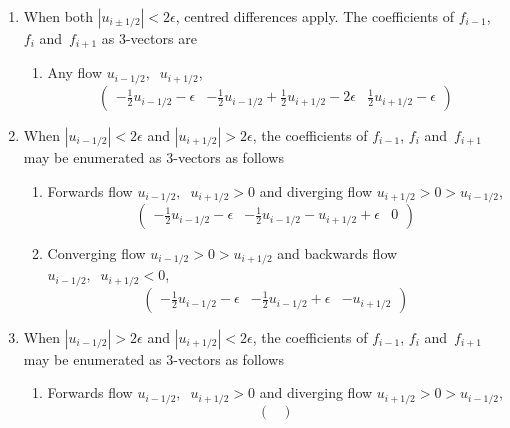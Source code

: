 \begin{enumerate}
\item When both $|u_{i\pm 1/2}|<2\epsilon$, centred differences apply. 
The coefficients of $f_{i-1}$, $f_i$ and~$f_{i+1}$ as 3-vectors are
\begin{enumerate}
\item Any flow $u_{i-1/2},\;\; u_{i+1/2}$,
\begin{equation}\begin{pmatrix}
-\frac{1}{2}u_{i-1/2}-\epsilon & -\frac{1}{2}u_{i-1/2} + \frac{1}{2}u_{i+1/2}-2\epsilon & \frac{1}{2}u_{i+1/2}-\epsilon
\end{pmatrix} \end{equation}
\end{enumerate}
\item When $|u_{i-1/2}|< 2\epsilon$ and $|u_{i+1/2}|> 2\epsilon$,
the coefficients of $f_{i-1}$, $f_i$ and~$f_{i+1}$
may be enumerated as 3-vectors as follows
\begin{enumerate}
\item Forwards flow $u_{i-1/2},\;\; u_{i+1/2} > 0$ and diverging flow $u_{i+1/2}>0>u_{i-1/2}$,
\begin{equation}\begin{pmatrix}
-\frac{1}{2}u_{i-1/2} -\epsilon & -\frac{1}{2}u_{i-1/2} -u_{i+1/2}+\epsilon & 0
\end{pmatrix} \end{equation}
\item Converging flow $u_{i-1/2}>0>u_{i+1/2}$ and backwards flow $u_{i-1/2},\;\; u_{i+1/2} < 0$,
\begin{equation}\begin{pmatrix}
-\frac{1}{2}u_{i-1/2} -\epsilon & -\frac{1}{2}u_{i-1/2} +\epsilon &  -u_{i+1/2}
\end{pmatrix} \end{equation}
\end{enumerate}
\item When $|u_{i-1/2}|> 2\epsilon$ and $|u_{i+1/2}|< 2\epsilon$,
the coefficients of $f_{i-1}$, $f_i$ and~$f_{i+1}$
may be enumerated as 3-vectors as follows
\begin{enumerate}
\item Forwards flow $u_{i-1/2},\;\; u_{i+1/2} > 0$ and diverging flow $u_{i+1/2}>0>u_{i-1/2}$,
\begin{equation}\begin{pmatrix}

\end{pmatrix}
\end{equation}
\end{enumerate}
\end{enumerate}
